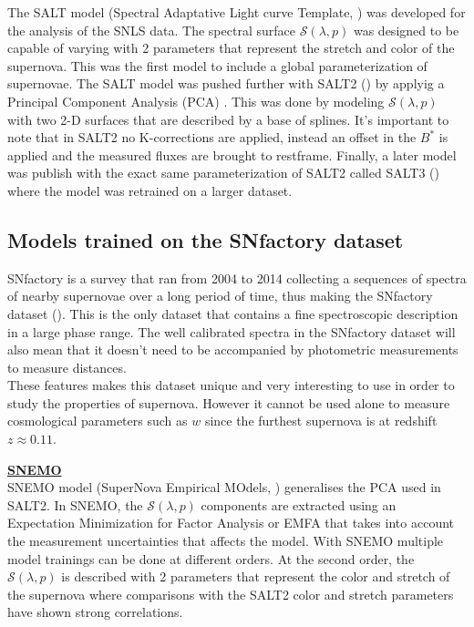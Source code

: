 The SALT model (Spectral Adaptative Light curve Template, \cite{Guy_2005}) was developed for the analysis of the SNLS data. The spectral surface $\mathcal{S}(\lambda, p)$
was designed to be capable of varying with 2 parameters that represent the stretch and color of the supernova. This was the first model to include a global parameterization of
supernovae.
The SALT model was pushed further with SALT2 (\cite{Guy_2007_SALT2}) by applyig a Principal Component Analysis (PCA) . This was done by modeling $\mathcal{S}(\lambda, p)$ with two 2-D
surfaces that are described by a base of splines. It's important to note that in SALT2 no K-corrections are applied, instead an offset in the $B^*$ is applied and the measured 
fluxes are brought to restframe. Finally, a later model was publish with the exact same parameterization of SALT2 called SALT3 (\cite{Kenworthy_2021_SALT3}) where the model was
retrained on a larger dataset. \\

\subsection{Models trained on the SNfactory dataset}

SNfactory is a survey that ran from 2004 to 2014 collecting a sequences of spectra of nearby supernovae over a long period of time, thus making the SNfactory dataset (\cite{snfactory}). This is the only dataset that contains a fine spectroscopic description in a large phase range. The well calibrated spectra in the SNfactory dataset will also mean that it doesn't need to be accompanied by photometric measurements to measure distances. \\
These features makes this dataset unique and very interesting to use in order to study the properties of supernova. However it cannot be used alone to measure cosmological parameters such as $w$ since the furthest supernova is at redshift $z\approx0.11$. \


\noindent \textbf{\underline{SNEMO}} \\

SNEMO model (SuperNova Empirical MOdels, \cite{Saunders_2018_SNEMO}) generalises the PCA used in SALT2. In SNEMO, the $\mathcal{S}(\lambda, p)$ components are extracted
using an Expectation Minimization for Factor Analysis or EMFA that takes into account the measurement uncertainties that affects the model. With SNEMO 
multiple model trainings can be done at different orders. At the second order, the $\mathcal{S}(\lambda, p)$ is described with 2 parameters that represent the color and
stretch of the supernova where comparisons with the SALT2 color and stretch parameters have shown strong correlations. \\ 

